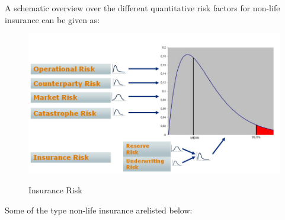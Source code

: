 \newpage
A schematic overview over the different quantitative risk factors for non-life insurance can be given as:
\begin{figure}[tbh] %
\begin{center}
	\includegraphics[width = 5in]{images/ir.png}
	\caption{Insurance Risk}\cite{grevskott_2011} %


	\label{Risk type}%
\end{center}
\end{figure}
\par
Some of the type non-life insurance arelisted below:\cite{grevskott_2011}
